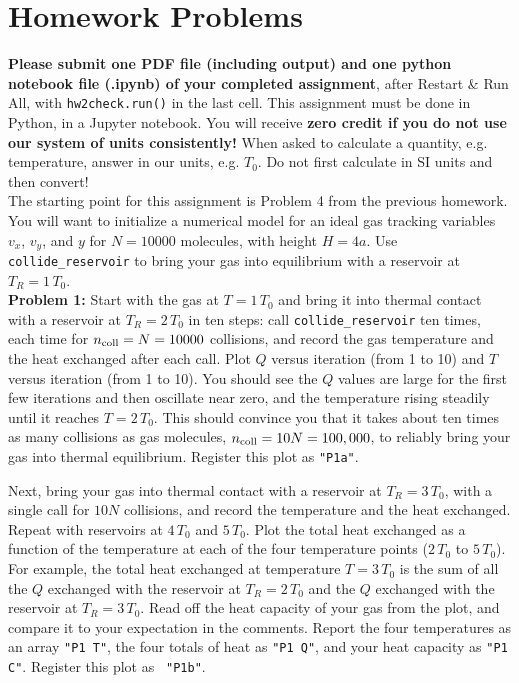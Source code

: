 \documentclass[12pt]{article}
\begin{document}
\section{Homework Problems}

\noindent
{\bf Please submit one PDF file (including output) and one python
  notebook file (.ipynb) of your completed assignment}, after Restart
\& Run All, with {\tt hw2check.run()} in the last cell.  This
assignment must be done in Python, in a Jupyter notebook.
You will receive {\bf zero credit if you do not use our system of
  units consistently!}  When asked to calculate a quantity,
e.g. temperature, answer in our units, e.g. $T_0$.  Do not first
calculate in SI units and then convert!\\[8pt]

\noindent
The starting point for this assignment is Problem 4 from the previous
homework.  You will want to initialize a numerical model for an ideal
gas tracking variables $v_x$, $v_y$, and $y$ for $N=10000$ molecules,
with height $H=4a$.  Use {\tt collide\_reservoir} to bring your gas
into equilibrium with a reservoir at $T_R = 1\, T_0$.\\[3pt]

\noindent
{\bf Problem 1:} Start with the gas at $T=1\,T_0$ and bring it into
thermal contact with a reservoir at $T_R=2\,T_0$ in ten steps: call
{\tt collide\_reservoir} ten times, each time for $n_{\rm coll} = N =
10000$ collisions, and record the gas temperature and the heat
exchanged after each call.  Plot $Q$ versus iteration (from 1 to 10)
and $T$ versus iteration (from 1 to 10).  You should see the $Q$
values are large for the first few iterations and then oscillate near
zero, and the temperature rising steadily until it reaches $T=2\,
T_0$.  This should convince you that it takes about ten times as many
collisions as gas molecules, $n_{\rm coll} = 10 N = 100,000$, to
reliably bring your gas into thermal equilibrium.  Register this plot
as {\tt "P1a"}.

Next, bring your gas into thermal contact with a reservoir at
$T_R=3\,T_0$, with a single call for $10 N$ collisions, and record the
temperature and the heat exchanged.  Repeat with reservoirs at $4\,T_0$
and $5\,T_0$.  Plot the total heat exchanged as a function of the
temperature at each of the four temperature points ($2\,T_0$ to
$5\,T_0$).  For example, the total heat exchanged at temperature
$T=3\,T_0$ is the sum of all the $Q$ exchanged with the reservoir at
$T_R = 2\,T_0$ and the $Q$ exchanged with the reservoir at $T_R = 3\,T_0$.
Read off the heat capacity of your gas from the plot, and compare it
to your expectation in the comments.  Report the four temperatures as
an array {\tt "P1 T"}, the four totals of heat as {\tt "P1 Q"}, and
your heat capacity as {\tt "P1 C"}.  Register this plot as {\tt
  "P1b"}.\\[3pt]
\end{document}
